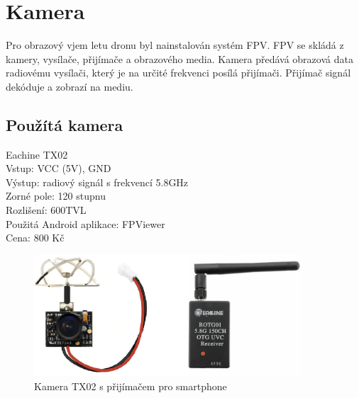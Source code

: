 \section{Kamera}
Pro obrazový vjem letu dronu byl nainstalován systém FPV.  FPV se skládá z kamery, vysílače, přijímače a obrazového media. Kamera předává obrazová data radiovému vysílači, který je na určité frekvenci posílá přijímači. Přijímač signál dekóduje a zobrazí na mediu.

\subsection{Použítá kamera}
Eachine TX02\\
Vstup: VCC (5V), GND\\
Výstup: radiový signál s frekvencí 5.8GHz\\
Zorné pole: 120 stupnu\\
Rozlišení: 600TVL\\
Použitá Android aplikace: FPViewer\\
Cena: 800 Kč\\

\begin{figure}[h]
	\centering
	\includegraphics[width=10cm]{pictures/camera.png}
	\caption{Kamera TX02 s přijímačem pro smartphone}
\end{figure}